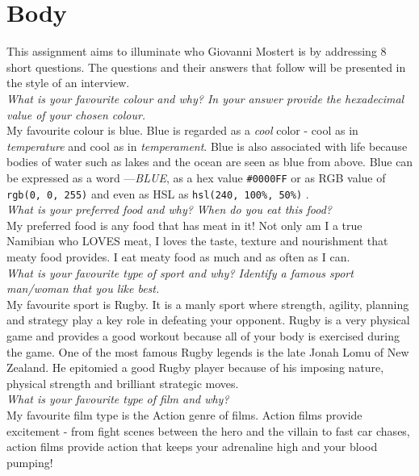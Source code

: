 \documentclass[a4paper,12pt]{article}
\begin{document}
\section{Body}
This assignment aims to illuminate who Giovanni Mostert is by addressing 8 short questions. The questions and their answers that follow will be presented in the style of an interview.
\\

\textit{What is your favourite colour and why? In your answer provide the hexadecimal value of your chosen colour.} \\
My favourite colour is blue. Blue is regarded as a \emph{cool} color - cool as in \textit{temperature} and cool as in \textit{temperament}. Blue is also associated with life because bodies of water such as lakes and the ocean are seen as blue from above. Blue can be expressed as a word ---\emph{BLUE}, as a hex value \texttt{\#0000FF} or as RGB value of \texttt{rgb(0, 0, 255)} and even as HSL as \texttt{hsl(240, 100\%, 50\%)} \citep{w3c:color}. 
\\

\textit{What is your preferred food and why? When do you eat this food?}\\
My preferred food is any food that has meat in it! Not only am I a true Namibian who LOVES meat, I loves the taste, texture and nourishment that meaty food provides. I eat meaty food as much and as often as I can.
\\

\textit{What is your favourite type of sport and why? Identify a famous sport man/woman that you like best.}\\
My favourite sport is Rugby. It is a manly sport where strength, agility, planning and strategy play a key role in defeating your opponent. Rugby is a very physical game and provides a good workout because all of your body is  exercised during the game. One of the most famous Rugby legends is the late Jonah Lomu of New Zealand. He epitomied a good Rugby player because of his imposing nature, physical strength and brilliant strategic moves.
\\

\textit{What is your favourite type of film and why?}\\
My favourite film type is the Action genre of films. Action films provide excitement - from fight scenes between the hero
    and the villain to fast car chases, action films provide action that keeps your adrenaline high and your blood pumping!
\\
\end{document}
